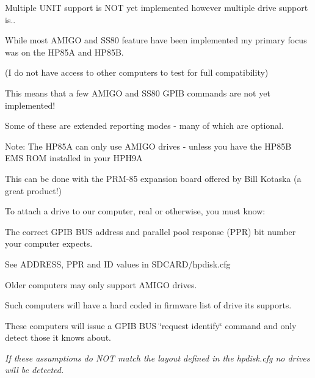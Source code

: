 Multiple U\+N\+IT support is N\+OT yet implemented however multiple drive support is..
\begin{DoxyItemize}
\item While most A\+M\+I\+GO and S\+S80 feature have been implemented my primary focus was on the H\+P85A and H\+P85B.
\begin{DoxyItemize}
\item (I do not have access to other computers to test for full compatibility)
\item This means that a few A\+M\+I\+GO and S\+S80 G\+P\+IB commands are not yet implemented!
\begin{DoxyItemize}
\item Some of these are extended reporting modes -\/ many of which are optional.
\end{DoxyItemize}
\item Note\+: The H\+P85A can only use A\+M\+I\+GO drives -\/ unless you have the H\+P85B E\+MS R\+OM installed in your H\+P\+H9A
\begin{DoxyItemize}
\item This can be done with the P\+R\+M-\/85 expansion board offered by Bill Kotaska (a great product!)
\end{DoxyItemize}
\end{DoxyItemize}
\item To attach a drive to our computer, real or otherwise, you must know\+:
\begin{DoxyItemize}
\item The correct G\+P\+IB B\+US address and parallel pool response (P\+PR) bit number your computer expects.
\begin{DoxyItemize}
\item See A\+D\+D\+R\+E\+SS, P\+PR and ID values in S\+D\+C\+A\+R\+D/hpdisk.\+cfg
\end{DoxyItemize}
\item Older computers may only support A\+M\+I\+GO drives.
\begin{DoxyItemize}
\item Such computers will have a hard coded in firmware list of drive its supports.
\begin{DoxyItemize}
\item These computers will issue a G\+P\+IB B\+US \char`\"{}request identify\char`\"{} command and only detect those it knows about.
\item {\itshape If these assumptions do N\+OT match the layout defined in the hpdisk.\+cfg no drives will be detected.}
\end{DoxyItemize}

\end{DoxyItemize}
\end{DoxyItemize}
\end{DoxyItemize}
